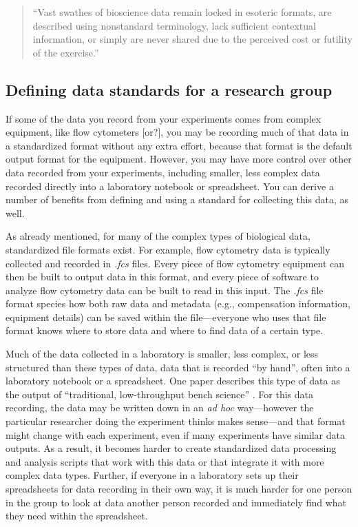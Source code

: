 \documentclass[]{tufte-book}
\begin{document}
\begin{quote}
``Vast swathes of bioscience data remain locked in esoteric formats, are
described using nonstandard terminology, lack sufficient contextual information,
or simply are never shared due to the perceived cost or futility of the
exercise.'' \citep{sansone2012toward}
\end{quote}

\hypertarget{defining-data-standards-for-a-research-group}{%
\subsection{Defining data standards for a research group}\label{defining-data-standards-for-a-research-group}}

If some of the data you record from your experiments comes from complex
equipment, like flow cytometers {[}or?{]}, you may be recording much of that data in
a standardized format without any extra effort, because that format is the
default output format for the equipment. However, you may have more control over
other data recorded from your experiments, including smaller, less complex data
recorded directly into a laboratory notebook or spreadsheet. You can derive a
number of benefits from defining and using a standard for collecting this data,
as well.

As already mentioned, for many of the complex types of biological data,
standardized file formats exist. For example, flow cytometry data is typically
collected and recorded in \emph{.fcs} files. Every piece of flow cytometry equipment
can then be built to output data in this format, and every piece of software to
analyze flow cytometry data can be built to read in this input. The \emph{.fcs} file
format species how both raw data and metadata (e.g., compensation information,
equipment details) can be saved within the file---everyone who uses that file
format knows where to store data and where to find data of a certain type.

Much of the data collected in a laboratory is smaller, less complex, or less
structured than these types of data, data that is recorded ``by hand'', often into
a laboratory notebook or a spreadsheet. One paper describes this type of data as
the output of ``traditional, low-throughput bench science'' \citep{wilkinson2016fair}.
For this data recording, the data may be written down in an \emph{ad hoc}
way---however the particular researcher doing the experiment thinks makes
sense---and that format might change with each experiment, even if many
experiments have similar data outputs. As a result, it becomes harder to create
standardized data processing and analysis scripts that work with this data or
that integrate it with more complex data types. Further, if everyone in a
laboratory sets up their spreadsheets for data recording in their own way, it is
much harder for one person in the group to look at data another person recorded
and immediately find what they need within the spreadsheet.
\end{document}
